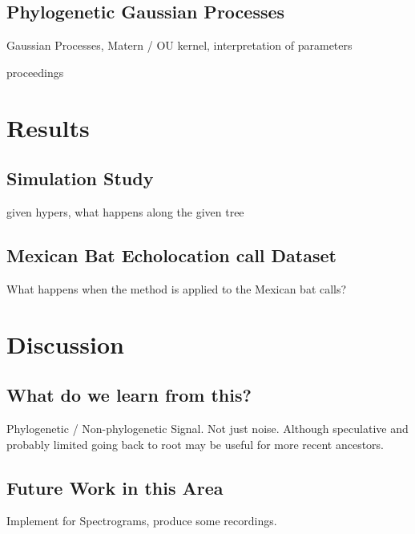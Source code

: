 \documentclass[wsdraft]{ws-rv9x6} %
\begin{document}
\subsection{Phylogenetic Gaussian Processes}

Gaussian Processes, Matern / OU kernel, interpretation of parameters

proceedings 

\section{Results}

\subsection{Simulation Study}

given hypers, what happens along the given tree

\subsection{Mexican Bat Echolocation call Dataset}

What happens when the method is applied to the Mexican bat calls?

\section{Discussion}

\subsection{What do we learn from this?}

Phylogenetic / Non-phylogenetic Signal. Not just noise. Although speculative and probably limited going back to root may be useful for more recent ancestors.

\subsection{Future Work in this Area}

Implement for Spectrograms, produce some recordings.





\end{document}
